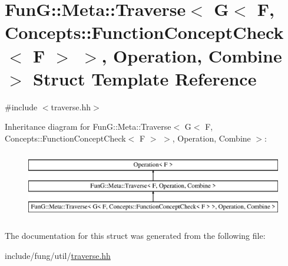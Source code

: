\hypertarget{structFunG_1_1Meta_1_1Traverse_3_01G_3_01F_00_01Concepts_1_1FunctionConceptCheck_3_01F_01_4_01_473eb79b17eeedd14b27190d68eb8ea5c}{}\section{FunG\+:\+:Meta\+:\+:Traverse$<$ G$<$ F, Concepts\+:\+:Function\+Concept\+Check$<$ F $>$ $>$, Operation, Combine $>$ Struct Template Reference}
\label{structFunG_1_1Meta_1_1Traverse_3_01G_3_01F_00_01Concepts_1_1FunctionConceptCheck_3_01F_01_4_01_473eb79b17eeedd14b27190d68eb8ea5c}


{\ttfamily \#include $<$traverse.\+hh$>$}

Inheritance diagram for FunG\+:\+:Meta\+:\+:Traverse$<$ G$<$ F, Concepts\+:\+:Function\+Concept\+Check$<$ F $>$ $>$, Operation, Combine $>$\+:\begin{figure}[H]
\begin{center}
\leavevmode
\includegraphics[height=2.989324cm]{structFunG_1_1Meta_1_1Traverse_3_01G_3_01F_00_01Concepts_1_1FunctionConceptCheck_3_01F_01_4_01_473eb79b17eeedd14b27190d68eb8ea5c}
\end{center}
\end{figure}


The documentation for this struct was generated from the following file\+:\begin{DoxyCompactItemize}
\item 
include/fung/util/\hyperlink{traverse_8hh}{traverse.\+hh}\end{DoxyCompactItemize}
